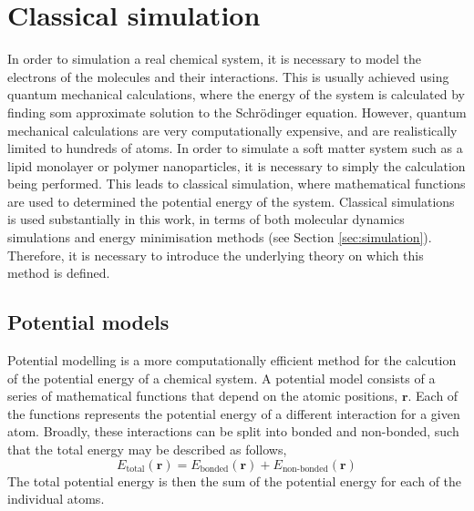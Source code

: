 \section{Classical simulation}
\label{sec:classical}

In order to simulation a real chemical system, it is necessary to model the electrons of the molecules and their interactions.
This is usually achieved using quantum mechanical calculations, where the energy of the system is calculated by finding som approximate solution to the Schr\"{o}dinger equation.
However, quantum mechanical calculations are very computationally expensive, and are realistically limited to hundreds of atoms.
In order to simulate a soft matter system such as a lipid monolayer or polymer nanoparticles, it is necessary to simply the calculation being performed.
This leads to classical simulation, where mathematical functions are used to determined the potential energy of the system.
Classical simulations is used substantially in this work, in terms of both molecular dynamics simulations and energy minimisation methods (see Section \ref{sec:simulation}).
Therefore, it is necessary to introduce the underlying theory on which this method is defined.

\subsection{Potential models}
Potential modelling is a more computationally efficient method for the calcution of the potential energy of a chemical system.
A potential model consists of a series of mathematical functions that depend on the atomic positions, $\mathbf{r}$.
Each of the functions represents the potential energy of a different interaction for a given atom.
Broadly, these interactions can be split into bonded and non-bonded, such that the total energy may be described as follows,
%
\begin{equation}
  E_{\text{total}}(\mathbf{r}) = E_{\text{bonded}}(\mathbf{r}) + E_{\text{non-bonded}}(\mathbf{r})
\end{equation}
%
The total potential energy is then the sum of the potential energy for each of the individual atoms.

